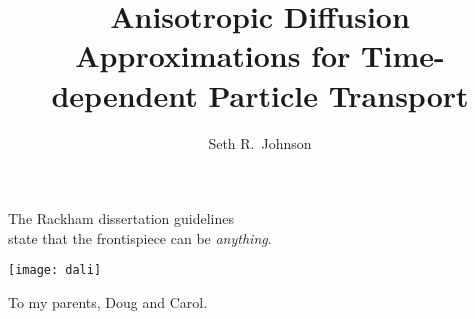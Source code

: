 \documentclass[twoside]{umthesis}
\author{Seth R.~Johnson}
\title{Anisotropic Diffusion Approximations for Time-dependent Particle
Transport%
}
\begin{document}
\allowdisplaybreaks
\setlength{\parskip}{0pt plus 0pt minus 0pt}

\frontmatter

\maketitle


\begin{frontispiece}
\begin{minipage}[t]{3in}
\begin{flushleft}
The Rackham dissertation guidelines\\
state that the frontispiece can be \emph{anything}.
\end{flushleft}
\end{minipage}

\vspace{1in}

  \texttt{[image: dali]}
\end{frontispiece}
  


\begin{dedication}
  To my parents, Doug and Carol.
\end{dedication}

\end{document}
